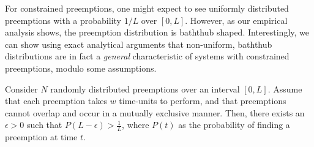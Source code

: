 For constrained preemptions, one might expect to see uniformly distributed preemptions with a probability $1/L$ over $[0, L]$. 
However, as our empirical analysis shows, the preemption distribution is baththub shaped.
Interestingly, we can show using exact analytical arguments that non-uniform, baththub distributions are in fact a \emph{general} characteristic of systems with constrained preemptions, modulo some assumptions. 

\begin{lemma}\label{lemma:1}
  Consider $N$ randomly distributed preemptions over an interval $[0, L]$.
  Assume that each preemption takes $w$ time-units to perform, and that preemptions cannot overlap and occur in a mutually exclusive manner.
  Then, there exists an $ \epsilon > 0$ such that  $P(L-\epsilon) > \frac{1}{L}$, where 
 $P(t)$ as the probability of finding a preemption at time $t$. 
\end{lemma}


